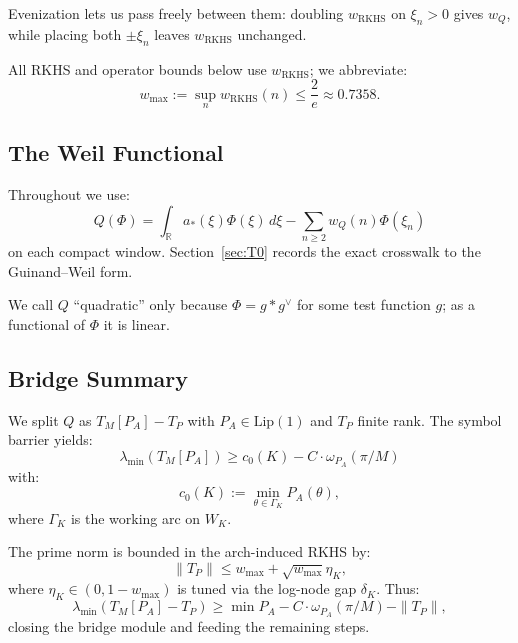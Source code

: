 Evenization lets us pass freely between them: doubling $w_{\mathrm{RKHS}}$ on $\xi_n > 0$ gives $w_Q$, while placing both $\pm \xi_n$ leaves $w_{\mathrm{RKHS}}$ unchanged.

All RKHS and operator bounds below use $w_{\mathrm{RKHS}}$; we abbreviate:
\begin{equation}
  w_{\max} := \sup_n w_{\mathrm{RKHS}}(n) \leq \frac{2}{e} \approx 0.7358.
\end{equation}

\subsection{The Weil Functional}

Throughout we use:
\begin{equation}
  Q(\Phi) = \int_{\mathbb{R}} a_*(\xi) \Phi(\xi) \, d\xi - \sum_{n \geq 2} w_Q(n) \Phi(\xi_n)
\end{equation}
on each compact window. Section~\ref{sec:T0} records the exact crosswalk to the Guinand--Weil form.

We call $Q$ ``quadratic'' only because $\Phi = g * g^\vee$ for some test function $g$; as a functional of $\Phi$ it is linear.

\subsection{Bridge Summary}

We split $Q$ as $T_M[P_A] - T_P$ with $P_A \in \mathrm{Lip}(1)$ and $T_P$ finite rank. The symbol barrier yields:
\begin{equation}
  \lambda_{\min}(T_M[P_A]) \geq c_0(K) - C \cdot \omega_{P_A}(\pi/M)
\end{equation}
with:
\begin{equation}
  c_0(K) := \min_{\theta \in \Gamma_K} P_A(\theta),
\end{equation}
where $\Gamma_K$ is the working arc on $W_K$.

The prime norm is bounded in the arch-induced RKHS by:
\begin{equation}
  \|T_P\| \leq w_{\max} + \sqrt{w_{\max}} \eta_K,
\end{equation}
where $\eta_K \in (0, 1 - w_{\max})$ is tuned via the log-node gap $\delta_K$. Thus:
\begin{equation}
  \lambda_{\min}(T_M[P_A] - T_P) \geq \min P_A - C \cdot \omega_{P_A}(\pi/M) - \|T_P\|,
\end{equation}
closing the bridge module and feeding the remaining steps.

